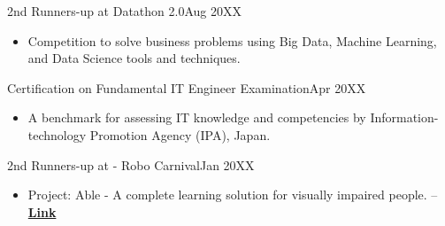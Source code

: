   \customSubHeadingContentStart
  
    \customSubHeading
      {2nd Runners-up at Datathon 2.0}{Aug 20XX}
      \begin{itemize}[itemsep=-3pt, left=0pt]
        \item {Competition to solve business problems using Big Data, Machine Learning, and Data Science tools and techniques.}
    \end{itemize}
    \vspace{-10pt}
      
    \customSubHeading
      {Certification on Fundamental IT Engineer Examination}{Apr 20XX}
     \begin{itemize}[itemsep=-3pt, left=0pt]
        \item{ A benchmark for assessing IT knowledge and competencies by Information-technology Promotion Agency (IPA), Japan.}
    \end{itemize}
    \vspace{-10pt}

    \customSubHeading
      {2nd Runners-up at - Robo Carnival}{Jan 20XX}
    \begin{itemize}[itemsep=-3pt, left=0pt]
        \item{Project: Able - A complete learning solution for visually impaired people. } – \textbf{\href{https://www.example.com/able}{Link}}
    \end{itemize}
    \vspace{-10pt}

  \customSubHeadingContentEnd
\vspace{-6pt}